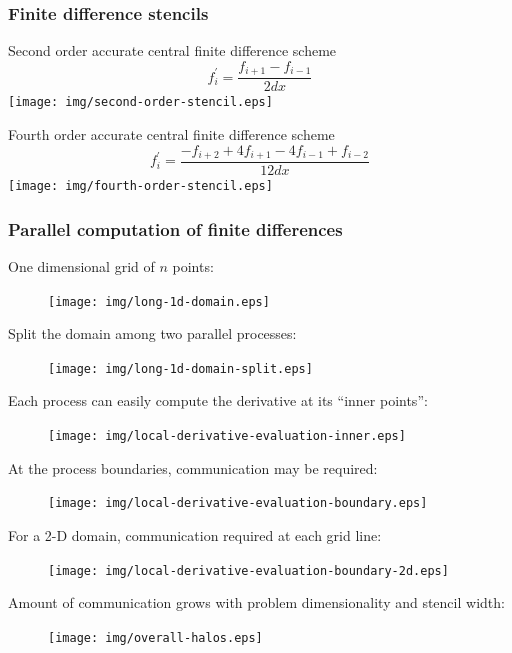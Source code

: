 \documentclass[8pt]{beamer}
\begin{document}
\begin{frame}[t]
\frametitle{Finite difference stencils}
\footnotesize

\begin{block}
{Second order accurate central finite difference scheme} 
\begin{equation*}
    f_i^\prime = \frac{f_{i+1} - f_{i-1}}{2dx}
\end{equation*}
\centering
\texttt{[image: img/second-order-stencil.eps]}
\end{block}

\begin{block}
{Fourth order accurate central finite difference scheme}
\begin{equation*}
    f_i^\prime = \frac{-f_{i+2} + 4f_{i+1} - 4f_{i-1} +f_{i-2}}{12dx}
\end{equation*}
\centering
\texttt{[image: img/fourth-order-stencil.eps]}
\end{block}
\end{frame}

\begin{frame}

\end{frame}


\begin{frame}
\frametitle{Parallel computation of finite differences}
 {
    One dimensional grid of $n$ points:
    \begin{figure}
    \centering
    \texttt{[image: img/long-1d-domain.eps]}
    \end{figure}
}
 {
    Split the domain among two parallel processes:
    \begin{figure}
    \centering
    \texttt{[image: img/long-1d-domain-split.eps]}
    \end{figure}
}
 {
    Each process can easily compute the derivative at its ``inner points'':
    \begin{figure}
    \centering
    \texttt{[image: img/local-derivative-evaluation-inner.eps]}
    \end{figure}
}
 {
    At the process boundaries, communication may be required:
    \begin{figure}
    \centering
    \texttt{[image: img/local-derivative-evaluation-boundary.eps]}
    \end{figure}
}
 {
    For a 2-D domain, communication required at each grid line:
    \begin{figure}
    \centering
    \texttt{[image: img/local-derivative-evaluation-boundary-2d.eps]}
    \end{figure}
}
 {
    Amount of communication grows with problem dimensionality and stencil width:
    \begin{figure}
    \centering
    \texttt{[image: img/overall-halos.eps]}
    \end{figure}
}
\end{frame}
\end{document}
